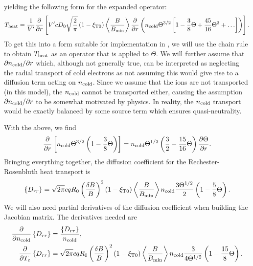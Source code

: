 \documentclass{notes}
\newcommand{\ncold}{n_{\rm cold}}
\newcommand{\Te}{T_e}
\newcommand{\VpVol}{V'}
\begin{document}
    yielding the following form for the expanded operator:
    \begin{equation}
        T_{\rm heat} = \frac{1}{\VpVol}\frac{\partial}{\partial r}\left[
            \VpVol cD_0\sqrt{\frac{2}{\pi}}\left(1-\xi_{\rm T0}\right)\left\langle\frac{B}{B_{\rm min}} \right\rangle
            \frac{\partial}{\partial r}\left( 
                \ncold \Theta^{3/2}\left[ 1 - \frac{3}{8}\Theta + \frac{45}{16}\Theta^2 + \ldots \right]
            \right)
        \right].
    \end{equation}
    To get this into a form suitable for implementation in \DREAM, we will use
    the chain rule to obtain $T_{\rm heat}$ as an operator that is applied to
    $\Theta$. We will further assume that $\partial\ncold/\partial r$ which,
    although not generally true, can be interpreted as neglecting the radial
    transport of cold electrons as not assuming this would give rise to a
    diffusion term acting on $\ncold$. Since we assume that the ions are not
    transported (in this model), the $\ncold$ cannot be transported either,
    causing the assumption $\partial\ncold/\partial r$ to be somewhat motivated
    by physics. In reality, the $\ncold$ transport would be exactly balanced by
    some source term which ensures quasi-neutrality.

    With the above, we find
    \begin{equation}
        \frac{\partial}{\partial r}\left[ \ncold\Theta^{3/2} \left(
            1 - \frac{3}{8}\Theta
        \right)\right] =
        \ncold\Theta^{1/2}\left( \frac{3}{2} - \frac{15}{16}\Theta \right)
        \frac{\partial\Theta}{\partial r}.
    \end{equation}
    Bringing everything together, the diffusion coefficient for the
    Rechester-Rosenbluth heat transport is
    \begin{equation}
        \left\{ D_{rr} \right\} =
        \sqrt{2\pi}cqR_0\left(\frac{\delta B}{B}\right)^2\left(1-\xi_{\rm T0}\right)
        \left\langle\frac{B}{B_{\rm min}}\right\rangle\ncold
        \frac{3\Theta^{1/2}}{2}\left( 1 - \frac{5}{8}\Theta \right).
    \end{equation}
    We will also need partial derivatives of the diffusion coefficient when
    building the Jacobian matrix. The derivatives needed are
    \begin{equation}
        \begin{aligned}
            \frac{\partial}{\partial\ncold}\left\{ D_{rr} \right\} &= \frac{\left\{ D_{rr} \right\}}{\ncold},\\
            \frac{\partial}{\partial\Te}\left\{ D_{rr} \right\} &=
                \sqrt{2\pi}cqR_0\left(\frac{\delta B}{B}\right)^2\left(1-\xi_{\rm T0}\right)
                \left\langle\frac{B}{B_{\rm min}}\right\rangle\ncold
                \frac{3}{4\Theta^{1/2}}\left( 1 - \frac{15}{8}\Theta \right).
        \end{aligned}
    \end{equation}
\end{document}
